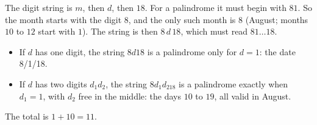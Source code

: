 The digit string is $m$, then $d$, then $18$. For a palindrome it must begin with $81$. So the month starts with the digit $8$, and the only such month is $8$ (August; months $10$ to $12$ start with $1$). The string is then $8\,d\,18$, which must read $81\ldots18$.
\begin{itemize}
\item If $d$ has one digit, the string $8d18$ is a palindrome only for $d=1$: the date 8/1/18.
\item If $d$ has two digits $d_1d_2$, the string $8d_1d_218$ is a palindrome exactly when $d_1=1$, with $d_2$ free in the middle: the days $10$ to $19$, all valid in August.
\end{itemize}
The total is $1+10=\boxed{11}$.
